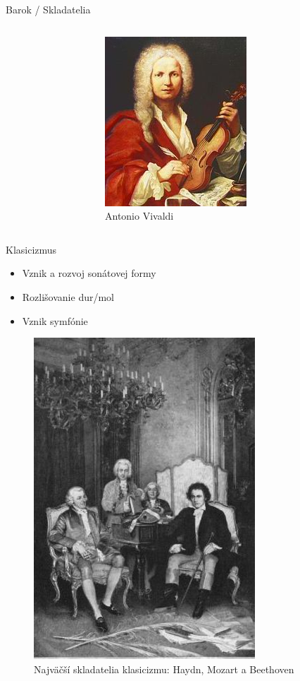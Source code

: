 \documentclass[dvipsnames]{beamer}
\begin{document}
\begin{frame}{\small Barok / \Large Skladatelia}
\begin{columns}
\begin{figure}
	\end{figure}%
	\begin{figure}
		\includegraphics[scale=1.75]{vivaldi}
		\caption{Antonio Vivaldi}
	\end{figure}

	\end{columns}
\end{frame}
\begin{frame}{Klasicizmus}
	\begin{itemize}
		\item Vznik a rozvoj sonátovej formy
		\item Rozlišovanie dur/mol
		\item Vznik symfónie
		
	\end{itemize}
	\begin{figure}
		\includegraphics[scale=0.3]{klasmu}
		\caption{Najväčší skladatelia klasicizmu: Haydn, Mozart a Beethoven}
	\end{figure}
\end{frame}
\end{document}
